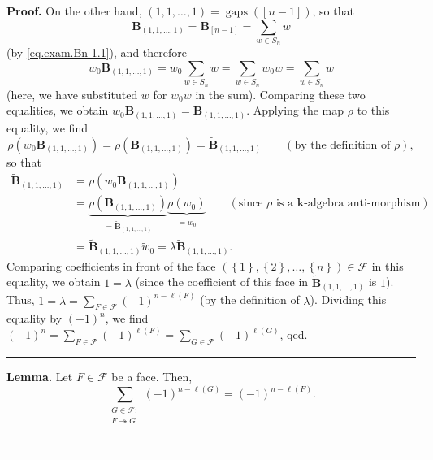 \documentclass[12pt]{article}
\theoremstyle{definition}%
\newtheorem{lem}[thm]{Lemma}
\theoremstyle{definition}%
\theoremstyle{remark}%
\newcommand{\tup}[1]{\left( #1 \right)}
\newcommand{\interval}[1]{\left[ #1 \right]} %
\newcommand{\set}[1]{\left\{ #1 \right\}}
\newcommand{\kk}{\mathbf{k}}
\newcommand{\BB}{\mathbf{B}}
\newcommand{\BBt}{\widetilde{\mathbf{B}}}
\newcommand{\CF}{\mathcal{F}}
\newcommand{\wo}{w_0} %
\newcommand{\wotil}{\widetilde{w}_0}
\newcommand{\gaps}{\operatorname{gaps}}
\newcommand{\con}{\twoheadrightarrow} %
\newenvironment{lem}[1][Lemma]{\noindent\textbf{#1.} }{\ \rule{0.5em}{0.5em}}
\newenvironment{proof}[1][Proof]{\noindent\textbf{#1.} }{\ \rule{0.5em}{0.5em}}
\begin{document}
\begin{proof}
On the other hand,
$\tup{1, 1, \ldots, 1} = \gaps\tup{\interval{n-1}}$, so that
\[
\BB_{\tup{1, 1, \ldots, 1}}
= \BB_{\interval{n-1}} = \sum_{w \in S_n} w
\]
(by \eqref{eq.exam.Bn-1.1}), and therefore
\[
\wo \BB_{\tup{1, 1, \ldots, 1}}
= \wo \sum_{w \in S_n} w
= \sum_{w \in S_n} \wo w
= \sum_{w \in S_n} w
\]
(here, we have substituted $w$ for $\wo w$ in the
sum). Comparing these two equalities, we obtain
$\wo\BB_{\tup{1, 1, \ldots, 1}}
=\BB_{\tup{1, 1, \ldots, 1}}$.
Applying the map $\rho$ to this equality, we find
\[
\rho \tup{ \wo\BB_{\tup{1, 1, \ldots, 1}} }
=\rho \tup{ \BB_{\tup{1, 1, \ldots, 1}} }
=\BBt_{\tup{1, 1, \ldots, 1}}\qquad\left(  \text{by
the definition of }\rho\right)  ,
\]
so that
\begin{align*}
\BBt_{\tup{1, 1, \ldots, 1}}
& =\rho \tup{ \wo \BB_{\tup{1, 1, \ldots, 1}} } \\
& =\underbrace{\rho \tup{ \BB_{\tup{1, 1, \ldots, 1}} }
}_{=\BBt_{\tup{1, 1, \ldots, 1}}}\underbrace{\rho
\tup{ \wo } }_{=\wotil}\qquad\left(  \text{since }
\rho\text{ is a }\kk\text{-algebra anti-morphism}\right)  \\
& =\BBt_{\tup{1, 1, \ldots, 1}}
\wotil=\lambda\BBt_{\tup{1, 1, \ldots, 1}}.
\end{align*}
Comparing coefficients in front of the face
$\tup{\set{1}, \set{2}, \ldots, \set{n}} \in \CF$
in this equality, we obtain $1 = \lambda$
(since the coefficient of this face in
$\BBt_{\tup{1, 1, \ldots, 1}}$ is $1$).
Thus, $1 = \lambda
=\sum_{F\in\CF} \tup{-1}^{n-\ell\tup{F} }$
(by the definition of $\lambda$). Dividing this
equality by $\tup{-1}^{n}$,
we find $\tup{-1}^{n}=\sum_{F\in\CF} \tup{-1}
^{\ell\tup{F} }=\sum_{G\in\CF} \tup{-1}
^{\ell\tup{G} }$, qed.
\end{proof}

\begin{lem}
\label{lem.altsum.faces}
Let $F \in \CF$ be a face. Then,
\[
    \sum_{\substack{G \in \CF; \\ F \con G}} \tup{ -1 }^{n-\ell\tup{ G }}
	= \tup{ -1 }^{n-\ell\tup{ F }} .
\]
\end{lem}
\end{document}
